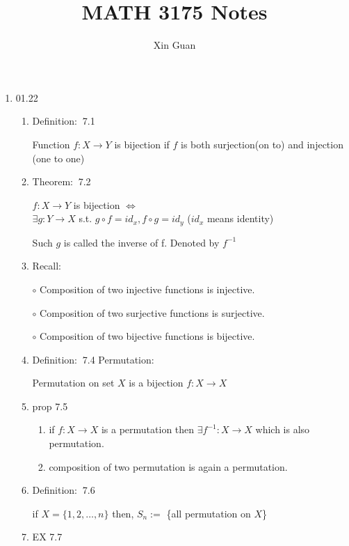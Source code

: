 \documentclass[12pt]{article}
\title{MATH 3175 Notes}
\date{}
\author{Xin Guan}
\newcommand{\theo}{{\color{blue} Theorem: $\ $}}
\newcommand{\defi}{{\color{blue} Definition: $\ $}}
\newcommand{\recall}{{\color{blue} Recall: $\ $}}
\begin{document}
  
\maketitle
\begin{enumerate}
    \item 01.22
    \begin{enumerate}
        \item \defi 7.1
        
        Function $f: X \rightarrow Y$ is bijection if $f$ is both surjection(on to) and injection (one to one)

        \item \theo 7.2 
        
        $f: X \rightarrow Y$ is bijection $\Leftrightarrow$\\
        $\exists g: Y \rightarrow X$ s.t. $g \circ f = id_x, f \circ g = id_y$ ($id_x$ means identity)

        Such $g$ is called the inverse of f. Denoted by $f^{-1}$

        \item \recall 
        
        $\circ$ Composition of two injective functions is injective. 

        $\circ$ Composition of two surjective functions is surjective.

        $\circ$ Composition of two bijective functions is bijective.

        \item \defi 7.4 Permutation:
        
        Permutation on set $X$ is a bijection $f : X \rightarrow X$

        \item prop 7.5
        \begin{enumerate}
            \item if $f: X \rightarrow X$ is a permutation then $\exists f^{-1}: X \rightarrow X$ which is also permutation.
            \item composition of two permutation is again a permutation.
        \end{enumerate}

        \item \defi 7.6
        
        if $X = \{1,2,\dots,n\}$ then, $S_n :=$ \{all permutation on $X$\} 

        \item EX 7.7
        

\end{enumerate}
\end{enumerate}
\end{document}
